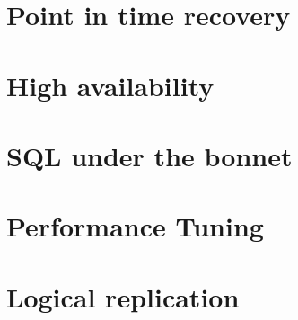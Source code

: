 \documentclass[twoside]{book}
\begin{document}
\tableofcontents{}






\chapter{Point in time recovery}
\chapter{High availability}
\chapter{SQL under the bonnet}
\chapter{Performance Tuning}
\chapter{Logical replication}

\appendix

\listoffigures
\listoftables
\printindex{}
\end{document}
